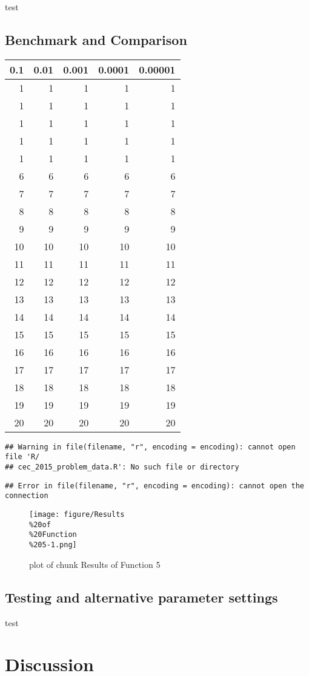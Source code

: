 \documentclass[12pt,a4paper]{article}
\begin{document}
test

\subsection{Benchmark and Comparison}\label{benchmark-and-comparison}

\begin{longtable}[c]{@{}rrrrr@{}}
\toprule
0.1 & 0.01 & 0.001 & 0.0001 & 0.00001\tabularnewline
\midrule
\endhead
1 & 1 & 1 & 1 & 1\tabularnewline
1 & 1 & 1 & 1 & 1\tabularnewline
1 & 1 & 1 & 1 & 1\tabularnewline
1 & 1 & 1 & 1 & 1\tabularnewline
1 & 1 & 1 & 1 & 1\tabularnewline
6 & 6 & 6 & 6 & 6\tabularnewline
7 & 7 & 7 & 7 & 7\tabularnewline
8 & 8 & 8 & 8 & 8\tabularnewline
9 & 9 & 9 & 9 & 9\tabularnewline
10 & 10 & 10 & 10 & 10\tabularnewline
11 & 11 & 11 & 11 & 11\tabularnewline
12 & 12 & 12 & 12 & 12\tabularnewline
13 & 13 & 13 & 13 & 13\tabularnewline
14 & 14 & 14 & 14 & 14\tabularnewline
15 & 15 & 15 & 15 & 15\tabularnewline
16 & 16 & 16 & 16 & 16\tabularnewline
17 & 17 & 17 & 17 & 17\tabularnewline
18 & 18 & 18 & 18 & 18\tabularnewline
19 & 19 & 19 & 19 & 19\tabularnewline
20 & 20 & 20 & 20 & 20\tabularnewline
\bottomrule
\end{longtable}

\begin{verbatim}
## Warning in file(filename, "r", encoding = encoding): cannot open file 'R/
## cec_2015_problem_data.R': No such file or directory
\end{verbatim}

\begin{verbatim}
## Error in file(filename, "r", encoding = encoding): cannot open the connection
\end{verbatim}

\begin{figure}[htbp]
\centering
\texttt{[image: figure/Results\\\%20of\\\%20Function\\\%205-1.png]}
\caption{plot of chunk Results of Function 5}
\end{figure}

\subsection{Testing and alternative parameter
settings}\label{testing-and-alternative-parameter-settings}

test

\section{Discussion}\label{discussion}
\end{document}
